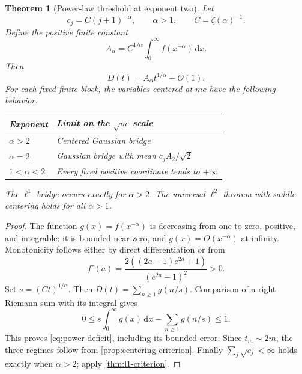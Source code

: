 \documentclass[11pt,a4paper]{article}
\numberwithin{equation}{section}
\newtheorem{theorem}{Theorem}[section]
\theoremstyle{definition}
\theoremstyle{remark}
\newcommand{\dd}{\,\mathrm d}
\begin{document}
\begin{theorem}[Power-law threshold at exponent two]
\label{thm:power}
Let
\[
c_j=C(j+1)^{-\alpha},\qquad \alpha>1,\qquad C=\zeta(\alpha)^{-1}.
\]
Define the positive finite constant
\begin{equation}
A_\alpha=C^{1/\alpha}\int_0^\infty
 f(x^{-\alpha})\dd x.
\label{eq:power-constant}
\end{equation}
Then
\begin{equation}
D(t)=A_\alpha t^{1/\alpha}+O(1).
\label{eq:power-deficit}
\end{equation}
For each fixed finite block, the variables centered at $mc$ have the
following behavior:
\begin{center}
\begin{tabular}{@{}ll@{}}
\toprule
Exponent & Limit on the $\sqrt m$ scale \\
\midrule
$\alpha>2$ & Centered Gaussian bridge \\
$\alpha=2$ & Gaussian bridge with mean $c_jA_2/\sqrt2$ \\
$1<\alpha<2$ & Every fixed positive coordinate tends to $+\infty$ \\
\bottomrule
\end{tabular}
\end{center}
The $\ell^1$ bridge occurs exactly for $\alpha>2$. The universal
$\ell^2$ theorem with saddle centering holds for all $\alpha>1$.
\end{theorem}
\begin{proof}
The function $g(x)=f(x^{-\alpha})$ is decreasing from one to zero,
positive, and integrable: it is bounded near zero, and
$g(x)=O(x^{-\alpha})$ at infinity. Monotonicity follows either by
direct differentiation or from
\[
f'(a)=\frac{2((2a-1)e^{2a}+1)}{(e^{2a}-1)^2}>0.
\]
Set $s=(Ct)^{1/\alpha}$. Then
$D(t)=\sum_{n\ge1}g(n/s)$.
Comparison of a right Riemann sum with its integral gives
\[
0\le s\int_0^\infty g(x)\dd x-\sum_{n\ge1}g(n/s)\le1.
\]
This proves \cref{eq:power-deficit}, including its bounded error.
Since $t_m\sim2m$, the three regimes follow from
\cref{prop:centering-criterion}. Finally
$\sum_j\sqrt{c_j}<\infty$ holds exactly when $\alpha>2$;
apply \cref{thm:l1-criterion}.
\end{proof}
\end{document}
